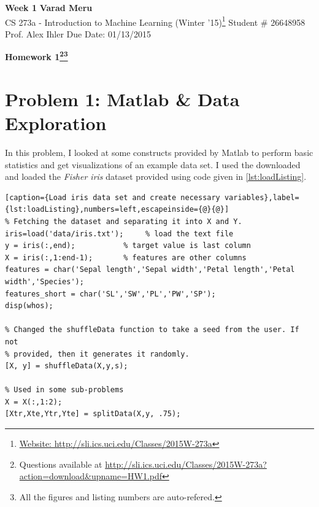\documentclass[a4paper, 11pt]{article}
\begin{document}
\begin{noindent}
\large\textbf{Week 1} \hfill \textbf{Varad Meru} \\
\normalsize CS 273a - Introduction to Machine Learning (Winter '15)\footnote{\href{http://sli.ics.uci.edu/Classes/2015W-273a}{Website: http://sli.ics.uci.edu/Classes/2015W-273a}} \hfill Student \# 26648958 \\
Prof. Alex Ihler \hfill Due Date: 01/13/2015
\end{noindent}
\noindent\makebox[\linewidth]{\rule{\textwidth}{0.4pt}}

\begin{center}
\textbf{\Large{Homework 1}\footnote{Questions available at \href{http://sli.ics.uci.edu/Classes/2015W-273a?action=download&upname=HW1.pdf}{http://sli.ics.uci.edu/Classes/2015W-273a?action=download\&upname=HW1.pdf}}\footnote{All the figures and listing numbers are auto-refered.}}\\
\end{center}
\vspace{-25pt}

\section*{Problem 1: Matlab \& Data Exploration}
\vspace{-5pt}
In this problem, I looked at some constructs provided by Matlab to perform basic statistics and get visualizations of an example data set. I used the downloaded and loaded the \textit{Fisher iris} dataset provided using code given in \autoref{lst:loadListing}.
\vspace{-15pt}
\begin{lstlisting}[caption={Load iris data set and create necessary variables},label={lst:loadListing},numbers=left,escapeinside={@}{@}]
% Fetching the dataset and separating it into X and Y.
iris=load('data/iris.txt');     % load the text file
y = iris(:,end);           % target value is last column
X = iris(:,1:end-1);       % features are other columns
features = char('Sepal length','Sepal width','Petal length','Petal width','Species');
features_short = char('SL','SW','PL','PW','SP');
disp(whos);

% Changed the shuffleData function to take a seed from the user. If not
% provided, then it generates it randomly.
[X, y] = shuffleData(X,y,s);

% Used in some sub-problems
X = X(:,1:2);
[Xtr,Xte,Ytr,Yte] = splitData(X,y, .75);
\end{lstlisting}
\end{document}
